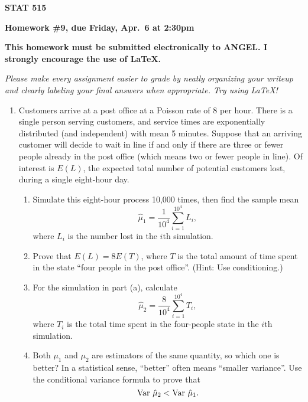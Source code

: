 \documentclass{article}
\def\Var{\mathop{\rm Var\,}\nolimits}
\begin{document}
\begin{center}
{\bf STAT 515}

{\bf Homework \#9, due Friday, Apr.~6 at 2:30pm}

{\bf This homework must be submitted electronically to ANGEL. I strongly
encourage the use of \LaTeX.}

\end{center}

{\it Please make every assignment easier to grade by neatly organizing your
writeup and clearly labeling your final answers when appropriate. Try using
\LaTeX!}


\begin{enumerate}

  \item Customers arrive at a post office at a Poisson rate of 8 per hour. There
  is a single person serving customers, and service times are exponentially
  distributed (and independent) with mean 5 minutes. Suppose that an arriving
  customer will decide to wait in line if and only if there are three or fewer
  people already in the post office (which means two or fewer people in line).
  Of interest is $E(L)$, the expected total number of potential customers lost,
  during a single eight-hour day.
  
    \begin{enumerate}
    
    \item Simulate this eight-hour process 10,000 times, then find the sample
    mean
    \[
    \hat\mu_1 = \frac{1}{10^{4}} \sum_{i=1}^{10^4} L_i,
    \]
    where $L_i$ is the number lost in the $i$th simulation.

    \item Prove that $E(L)=8E(T)$, where $T$ is the total amount of time spent
    in the state ``four people in the post office''. (Hint: Use conditioning.)

    \item For the simulation in part (a), calculate
    \[
    \hat\mu_2 = \frac{8}{10^4} \sum_{i=1}^{10^4} T_i,
    \]
    where $T_i$ is the total time spent in the four-people state in the $i$th
    simulation.
    
    \item Both $\mu_1$ and $\mu_2$ are estimators of the same quantity, so which
    one is better? In a statistical sense, ``better'' often means ``smaller
    variance''. Use the conditional variance formula to prove that
    \[
    \Var \hat \mu_2 < \Var \hat\mu_1.
    \]


\end{enumerate}
\end{enumerate}
\end{document}

